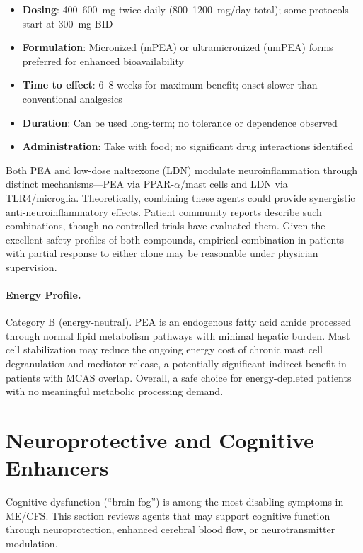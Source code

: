 \begin{itemize}
    \item \textbf{Dosing}: 400--600~mg twice daily (800--1200~mg/day total); some protocols start at 300~mg BID
    \item \textbf{Formulation}: Micronized (mPEA) or ultramicronized (umPEA) forms preferred for enhanced bioavailability
    \item \textbf{Time to effect}: 6--8 weeks for maximum benefit; onset slower than conventional analgesics
    \item \textbf{Duration}: Can be used long-term; no tolerance or dependence observed
    \item \textbf{Administration}: Take with food; no significant drug interactions identified
\end{itemize}

\begin{speculation}
Both PEA and low-dose naltrexone (LDN) modulate neuroinflammation through distinct mechanisms---PEA via PPAR-$\alpha$/mast cells and LDN via TLR4/microglia. Theoretically, combining these agents could provide synergistic anti-neuroinflammatory effects. Patient community reports describe such combinations, though no controlled trials have evaluated them. Given the excellent safety profiles of both compounds, empirical combination in patients with partial response to either alone may be reasonable under physician supervision.
\end{speculation}

\paragraph{Energy Profile.}
Category B (energy-neutral). PEA is an endogenous fatty acid amide processed through normal lipid metabolism pathways with minimal hepatic burden. Mast cell stabilization may reduce the ongoing energy cost of chronic mast cell degranulation and mediator release, a potentially significant indirect benefit in patients with MCAS overlap. Overall, a safe choice for energy-depleted patients with no meaningful metabolic processing demand.

\section{Neuroprotective and Cognitive Enhancers}
\label{sec:neuroprotective}

Cognitive dysfunction (``brain fog'') is among the most disabling symptoms in ME/CFS. This section reviews agents that may support cognitive function through neuroprotection, enhanced cerebral blood flow, or neurotransmitter modulation.

